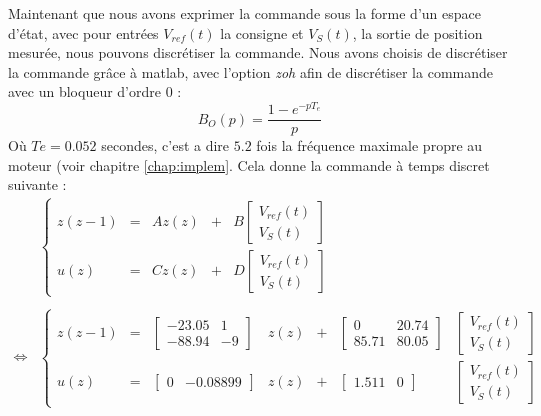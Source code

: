 Maintenant que nous avons exprimer la commande sous la forme d'un espace d'état, avec pour entrées $V_{ref}(t)$ la consigne et $V_S(t)$, la sortie de position mesurée, nous pouvons discrétiser la commande. Nous avons choisis de discrétiser la commande grâce à matlab, avec l'option \emph{zoh} afin de discrétiser la commande avec un bloqueur d'ordre 0 : \begin{equation}
 B_O(p)=\frac{1 - e^{-pT_e}}{p}
 \end{equation}
 Où $Te=0.052$ secondes, c'est a dire $5.2$ fois la fréquence maximale propre au moteur (voir chapitre \ref{chap:implem}.
Cela donne la commande à temps discret suivante :
\begin{equation}
\label{equ:EEcomTD}
\begin{array}{rl}
& \left\lbrace
\begin{array}{rclcl}
z(z-1) 	&=& A z(z) &+& B \begin{bmatrix} V_{ref}(t) \\ V_S(t)  \end{bmatrix}  \\
u(z)  	&=& C z(z) &+& D \begin{bmatrix} V_{ref}(t) \\ V_S(t)  \end{bmatrix}  
\end{array}
\right.\\
&\\
\Leftrightarrow &
\left\lbrace
\begin{array}{rclcclc}
z(z-1) 	&=& 
\begin{bmatrix}
-23.05   	&   1\\
-88.94    	&  	-9
\end{bmatrix} &z(z) 
&+& \begin{bmatrix}
0  		&	20.74\\
85.71 	&	80.05
\end{bmatrix} 
&\begin{bmatrix} V_{ref}(t) \\ V_S(t)  \end{bmatrix}  \\
u(z)  	&=& \begin{bmatrix}
0 		&	 -0.08899
\end{bmatrix} &z(z) &+& \begin{bmatrix}
1.511  	&    0
\end{bmatrix} 
&\begin{bmatrix} V_{ref}(t) \\ V_S(t)  \end{bmatrix}  
\end{array}
\right.
\end{array}
\end{equation}



